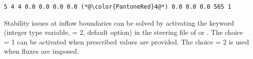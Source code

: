 \begin{lstlisting}[frame=trBL]
5 4 4 0.0 0.0 0.0 0.0 (*@\color{PantoneRed}4@*) 0.0 0.0 0.0 565 1
\end{lstlisting}

Stability issues at inflow boundaries can be solved by activating the keyword  (integer type variable, {\ttfamily = 2}, default option) in the steering file of  or . The choice {\ttfamily = 1} can be activated when prescribed values are provided. The choice {\ttfamily = 2} is used when fluxes are imposed.

%

